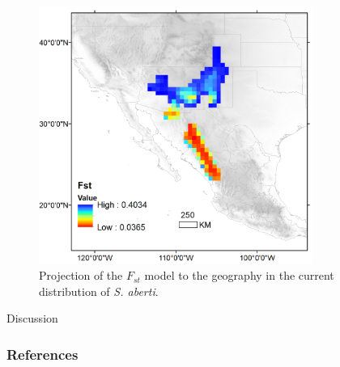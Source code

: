 \documentclass[
]{article}
\begin{document}
\begin{figure}
\centering
\includegraphics[width=0.8\textwidth,height=\textheight]{all_figures/figure_6.png}
\caption{Projection of the \(F_{st}\) model to the geography in the
 current distribution of \emph{S. aberti}.}
\end{figure}


Discussion


\hypertarget{references}{%
\subsubsection*{References}\label{references}}
\end{document}
